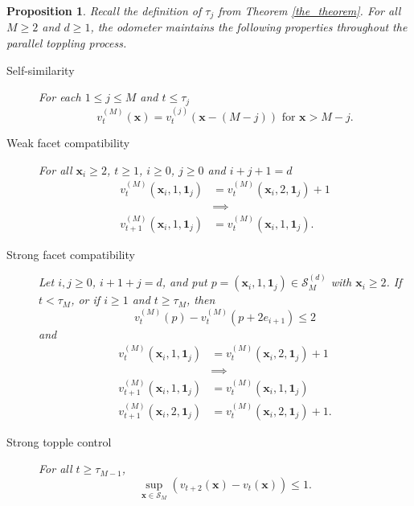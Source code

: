 \documentclass[12pt]{amsart}
\newtheorem{prop}{Proposition}[section]
\begin{document}
	
	\begin{prop}\label{base_dimension}
		Recall the definition of $\tau_{j}$ from Theorem \ref{the_theorem}. For all $M \geq 2$ and $d \geq 1$, the odometer maintains the following properties throughout the parallel toppling process.
		\begin{description}
			\item[Self-similarity]  For each $1 \leq j \leq M$ and $t \leq \tau_j$ 
			\begin{equation} \label{base_dimension:consistency}
			v_t^{(M)}(\mathbf{x}) =  v_t^{(j)}(\mathbf{x}-(M-j))  \mbox{ for $\mathbf{x} > M-j$}.
			\end{equation}
			\item[Weak facet compatibility] For all $\mathbf{x}_i \geq 2$, $t \geq 1$, $i \geq 0$, $j \geq 0$ and $i+j+1=d$
			\begin{equation} \label{base_dimension:weak_compatability}
			\begin{aligned}
			v_t^{(M)}(\mathbf{x}_i, 1, \mathbf{1}_j) &= v_t^{(M)}(\mathbf{x}_i, 2, \mathbf{1}_j)+ 1  \\
			& \implies \\
			v_{t+1}^{(M)}(\mathbf{x}_i,1,\mathbf{1}_j)
            &=v_t^{(M)}(\mathbf{x}_i,1,\mathbf{1}_j).
			\end{aligned} 
			\end{equation}
			\item[Strong facet compatibility] Let $i,j\geq0$, $i+1+j=d$,
            and put $p=(\mathbf{x}_i,1,\mathbf{1}_j)\in\mathcal S_M^{(d)}$
            with $\mathbf{x}_i\geq2$. If $t<\tau_M$, or if $i\geq1$ and
            $t\geq\tau_M$, then
            \begin{equation}\label{base_dimension:strong_derivative}
            v_t^{(M)}(p)-v_t^{(M)}(p+2e_{i+1})\leq2
			\end{equation}
			and
			\begin{equation} \label{base_dimension:strong_compatability}
			\begin{aligned} 
			v_t^{(M)}(\mathbf{x}_i,1,\mathbf{1}_j)
            &=v_t^{(M)}(\mathbf{x}_i,2,\mathbf{1}_j)+1\\
			& \implies \\
			v_{t+1}^{(M)}(\mathbf{x}_i, 1, \mathbf{1}_j) &= v_{t}^{(M)}(\mathbf{x}_i, 1, \mathbf{1}_j) \\
			v_{t+1}^{(M)}(\mathbf{x}_i, 2, \mathbf{1}_j) &= v_{t}^{(M)}(\mathbf{x}_i, 2, \mathbf{1}_j)+1.
			\end{aligned}
			\end{equation}

		
			
			\item[Strong topple control] 
			For all $t \geq \tau_{M-1}$, 
			\begin{equation} \label{base_dimension:strong_topple}
			\sup_{\mathbf{x} \in \mathcal{S}_M} \left(v_{t+2}(\mathbf{x}) - v_{t}(\mathbf{x})\right) \leq 1.
			\end{equation}

			
		\end{description}
		
	\end{prop}
	
\end{document}
